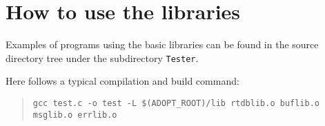 \appndx

\section{How to use the libraries}

Examples of programs using the basic libraries can be found in
the source directory tree under the subdirectory {\tt Tester}.

Here follows a typical compilation and build command:

\begin{quotation}
{\tt gcc test.c -o test -L \$(ADOPT\_ROOT)/lib rtdblib.o buflib.o msglib.o errlib.o }
\end{quotation}
